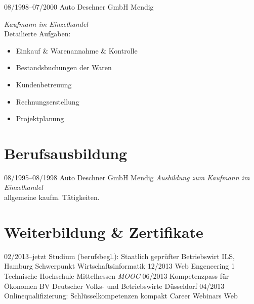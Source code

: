 \documentclass[a4paper,latin]{friggeri-cv} %
\begin{document}
\begin{entrylist}
\entry
{08/1998--07/2000}
{Auto Deschner GmbH}
 {Mendig}
{\emph{Kaufmann im Einzelhandel}\\
Detailierte Aufgaben:
\begin{itemize}
\item Einkauf \& Warenannahme \& Kontrolle
\item Bestandsbuchungen der Waren
\item Kundenbetreuung
\item Rechnungserstellung
\item Projektplanung
\end{itemize}
}
\end{entrylist}

\section{Berufsausbildung}
\begin{entrylist}
\entry
{08/1995--08/1998}
{Auto Deschner GmbH}
{Mendig}
{\emph{Ausbildung zum Kaufmann im Einzelhandel}\\
allgemeine kaufm. Tätigkeiten.
}
\end{entrylist}


\section{Weiterbildung \& Zertifikate}

\begin{entrylist}
\entry
{02/2013--jetzt}
{Studium (berufsbegl.): Staatlich geprüfter Betriebswirt}
{ILS, Hamburg}
{Schwerpunkt Wirtschaftsinformatik}
\entry
{12/2013}
{Web Engeneering 1}
{Technische Hochschule Mittelhessen}
{\emph{MOOC}}
\entry
{06/2013}
{Kompetenzpass für Ökonomen}
{BV Deutscher Volks- und Betriebswirte}
{Düsseldorf}
\entry
{04/2013}
{Onlinequalifizierung: Schlüsselkompetenzen kompakt}
{Career Webinars}
{Web}
\end{entrylist}
\end{document}
